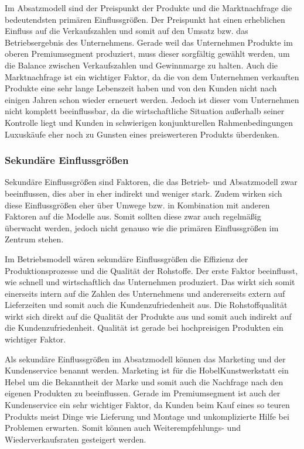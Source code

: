 Im Absatzmodell sind der Preispunkt der Produkte und die Marktnachfrage die bedeutendsten primären Einflussgrö{\ss}en. Der Preispunkt hat einen erheblichen Einfluss auf die Verkaufszahlen und somit auf den Umsatz bzw. das Betriebsergebnis des Unternehmens. Gerade weil das Unternehmen Produkte im oberen Premiumsegment produziert, muss dieser sorgfältig gewählt werden, um die Balance zwischen Verkaufszahlen und Gewinnmarge zu halten. Auch die Marktnachfrage ist ein wichtiger Faktor, da die von dem Unternehmen verkauften Produkte eine sehr lange Lebenszeit haben und von den Kunden nicht nach einigen Jahren schon wieder erneuert werden. Jedoch ist dieser vom Unternehmen nicht komplett beeinflussbar, da die wirtschaftliche Situation au{\ss}erhalb seiner Kontrolle liegt und Kunden in schwierigen konjunkturellen Rahmenbedingungen Luxuskäufe eher noch zu Gunsten eines preiswerteren Produkts überdenken. 

\subsubsection{Sekundäre Einflussgrö{\ss}en}

Sekundäre Einflussgrö{\ss}en sind Faktoren, die das Betrieb- und Absatzmodell zwar beeinflussen, dies aber in eher indirekt und weniger stark. Zudem wirken sich diese Einflussgrö{\ss}en eher über Umwege bzw. in Kombination mit anderen Faktoren auf die Modelle aus. Somit sollten diese zwar auch regelmä{\ss}ig überwacht werden, jedoch nicht genauso wie die primären Einflussgrö{\ss}en im Zentrum stehen.

Im Betriebsmodell wären sekundäre Einflussgrö{\ss}en die Effizienz der Produktionsprozesse und die Qualität der Rohstoffe. Der erste Faktor beeinflusst, wie schnell und wirtschaftlich das Unternehmen produziert. Das wirkt sich somit einerseits intern auf die Zahlen des Unternehmens und andererseits extern auf Lieferzeiten und somit auch die Kundenzufriedenheit aus. Die Rohstoffqualität wirkt sich direkt auf die Qualität der Produkte aus und somit auch indirekt auf die Kundenzufriedenheit. Qualität ist gerade bei hochpreisigen Produkten ein wichtiger Faktor.

Als sekundäre Einflussgrö{\ss}en im Absatzmodell können das Marketing und der Kundenservice benannt werden. Marketing ist für die HobelKunstwerkstatt ein Hebel um die Bekanntheit der Marke und somit auch die Nachfrage nach den eigenen Produkten zu beeinflussen. Gerade im Premiumsegment ist auch der Kundenservice ein sehr wichtiger Faktor, da Kunden beim Kauf eines so teuren Produkts meist Dinge wie Lieferung und Montage und unkomplizierte Hilfe bei Problemen erwarten. Somit können auch Weiterempfehlungs- und Wiederverkaufsraten gesteigert werden.

